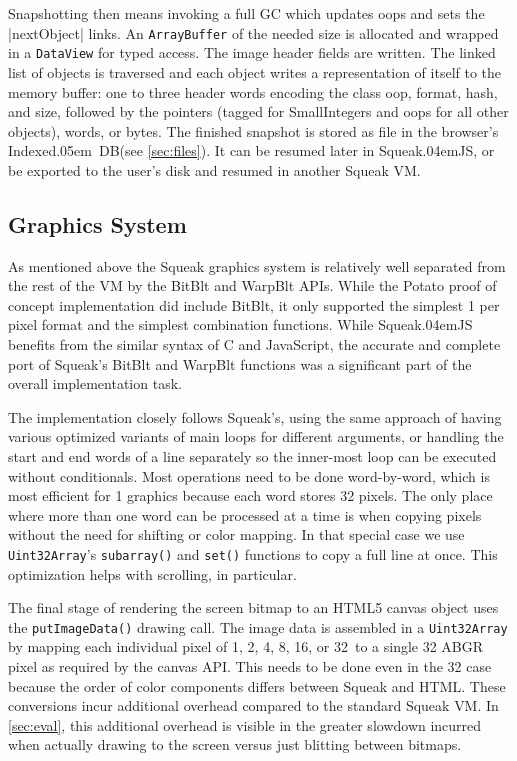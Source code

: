 \documentclass[natbib]{sigplanconf}
\newcommand*\SqueakJS{Squeak\texorpdfstring{\kern.04em}{}JS\xspace}
\newcommand*\JS{JavaScript\xspace}
\newcommand*\IndexedDB{\mbox{Indexed\kern.05em DB}\xspace}
\begin{document}
Snapshotting then means invoking a full \ac{GC} which updates oops and
sets the |nextObject| links. An \lstinline|ArrayBuffer| of the needed
size is allocated and wrapped in a \lstinline|DataView| for typed
access. The image header fields are written. The linked list of
objects is traversed and each object writes a representation of itself
to the memory buffer: one to three header words encoding the class
oop, format, hash, and size, followed by the pointers (tagged for
SmallIntegers and oops for all other objects), words, or bytes. The
finished snapshot is stored as file in the browser's
\IndexedDB  (see \autoref{sec:files}). It can be
resumed later in \SqueakJS, or be exported to the user's disk and
resumed in another Squeak \ac{VM}.

\subsection{Graphics System}

As mentioned above the Squeak graphics system is relatively well
separated from the rest of the \acf{VM} by the BitBlt and WarpBlt
\acp{API}. While the Potato proof of concept implementation did include
BitBlt, it only supported the simplest \SI{1}{\bit} per pixel format and the
simplest combination functions. While \SqueakJS benefits from the
similar syntax of C and \JS, the accurate and complete port of
Squeak's BitBlt and WarpBlt functions was a significant part of the
overall implementation task.

The implementation closely follows Squeak's, using the same approach
of having various optimized variants of main loops for different
arguments, or handling the start and end words of a line separately so
the inner-most loop can be executed without conditionals. Most
operations need to be done word-by-word, which is most efficient for
\SI{1}{\bit} graphics because each word stores 32 pixels. The only
place where more than one word can be processed at a time is when
copying pixels without the need for shifting or color mapping. In that
special case we use \lstinline|Uint32Array|'s \lstinline|subarray()|
and \lstinline|set()| functions to copy a full line at once. This
optimization helps with scrolling, in particular.

The final stage of rendering the screen bitmap to an HTML5 canvas
object uses the \lstinline|putImageData()| drawing call. The image
data is assembled in a \lstinline|Uint32Array| by mapping each
individual pixel of 1, 2, 4, 8, 16, or 32\,\si{\bit} to a single
\SI{32}{\bit} ABGR pixel as required by the canvas \ac{API}. This
needs to be done even in the \SI{32}{\bit} case because the order of
color components differs between Squeak and HTML. These conversions
incur additional overhead compared to the standard Squeak \ac{VM}. In
\autoref{sec:eval}, this additional overhead is visible in the greater
slowdown incurred when actually drawing to the screen versus just
blitting between bitmaps.
\end{document}
